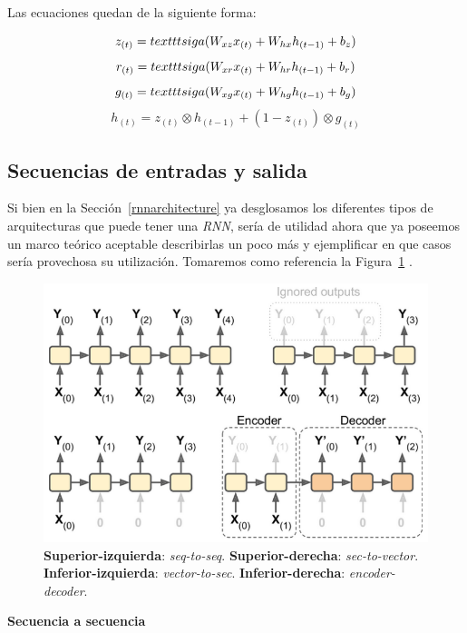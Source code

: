 \documentclass[a4paper,12pt]{article}
\begin{document}
Las ecuaciones quedan de la siguiente forma:

$$z_{(t)}=\\texttt{sig}a(W_{xz}x_{(t)} + W_{hx}h_{(t-1)} + b_z)$$
$$r_{(t)}=\\texttt{sig}a(W_{xr}x_{(t)} + W_{hr}h_{(t-1)} + b_r)$$
$$g_{(t)}=\\texttt{sig}a(W_{xg}x_{(t)} + W_{hg}h_{(t-1)} + b_g)$$
$$h_{(t)}=z_{(t)} \otimes h_{(t-1)} + (1-z_{(t)}) \otimes g_{(t)}$$

\subsection{Secuencias de entradas y salida}

Si bien en la Sección~\ref{rnnarchitecture} ya desglosamos los diferentes tipos de arquitecturas que puede tener una \textit{RNN}, sería de utilidad ahora que ya poseemos un marco teórico aceptable describirlas un poco más y ejemplificar en que casos sería provechosa su utilización. Tomaremos como referencia la Figura~\ref{fig:rnnnets} \citep{geron}.

\begin{figure}[H]
	\begin{center}				
	\includegraphics[width=1\textwidth]{tesis_42.png}
  	\caption{\textbf{Superior-izquierda}: \textit{seq-to-seq}. \textbf{Superior-derecha}: \textit{sec-to-vector}. \textbf{Inferior-izquierda}: \textit{vector-to-sec}. \textbf{Inferior-derecha}: \textit{encoder-decoder}.}
  	\label{fig:rnnnets}
  	\end{center}
\end{figure}

\textbf{Secuencia a secuencia}
\end{document}
